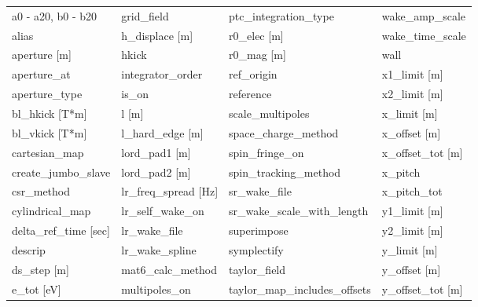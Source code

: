  \begin{tabular}{llll} \toprule
a0 - a20, b0 - b20             & grid_field                     & ptc_integration_type           & wake_amp_scale                 \\
alias                          & h_displace [m]                 & r0_elec [m]                    & wake_time_scale                \\
aperture [m]                   & hkick                          & r0_mag [m]                     & wall                           \\
aperture_at                    & integrator_order               & ref_origin                     & x1_limit [m]                   \\
aperture_type                  & is_on                          & reference                      & x2_limit [m]                   \\
bl_hkick [T*m]                 & l [m]                          & scale_multipoles               & x_limit [m]                    \\
bl_vkick [T*m]                 & l_hard_edge [m]                & space_charge_method            & x_offset [m]                   \\
cartesian_map                  & lord_pad1 [m]                  & spin_fringe_on                 & x_offset_tot [m]               \\
create_jumbo_slave             & lord_pad2 [m]                  & spin_tracking_method           & x_pitch                        \\
csr_method                     & lr_freq_spread [Hz]            & sr_wake_file                   & x_pitch_tot                    \\
cylindrical_map                & lr_self_wake_on                & sr_wake_scale_with_length      & y1_limit [m]                   \\
delta_ref_time [sec]           & lr_wake_file                   & superimpose                    & y2_limit [m]                   \\
descrip                        & lr_wake_spline                 & symplectify                    & y_limit [m]                    \\
ds_step [m]                    & mat6_calc_method               & taylor_field                   & y_offset [m]                   \\
e_tot [eV]                     & multipoles_on                  & taylor_map_includes_offsets    & y_offset_tot [m]               \\

\end{tabular}

